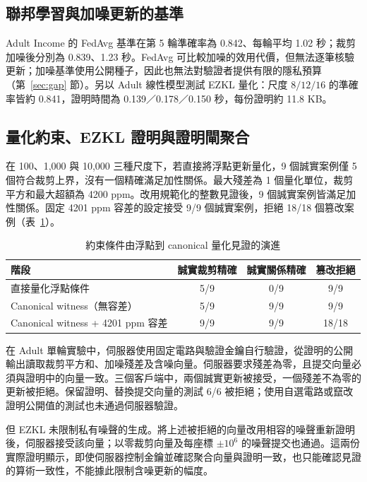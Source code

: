 \documentclass[12pt,a4paper]{article}
\begin{document}
\subsection{聯邦學習與加噪更新的基準}
\label{sec:res-baseline}
Adult Income 的 FedAvg 基準在第 5 輪準確率為 0.842、每輪平均 1.02 秒；裁剪加噪後分別為 0.839、1.23 秒。FedAvg 可比較加噪的效用代價，但無法逐筆核驗更新；加噪基準使用公開種子，因此也無法對驗證者提供有限的隱私預算（第~\ref{sec:gap} 節）。另以 Adult 線性模型測試 EZKL 量化：尺度 $8/12/16$ 的準確率皆約 0.841，證明時間為 0.139／0.178／0.150 秒，每份證明約 11.8 KB。

\subsection{量化約束、EZKL 證明與證明閘聚合}
\label{sec:res-constraint}
在 100、1,000 與 10,000 三種尺度下，若直接將浮點更新量化，9 個誠實案例僅 5 個符合裁剪上界，沒有一個精確滿足加性關係。最大殘差為 1 個量化單位，裁剪平方和最大超額為 4200 ppm。改用規範化的整數見證後，9 個誠實案例皆滿足加性關係。固定 4201 ppm 容差的設定接受 9/9 個誠實案例，拒絕 18/18 個篡改案例（表~\ref{tab:constraint}）。

\begin{table}[H]
\centering\small
\caption{約束條件由浮點到 canonical 量化見證的演進}
\label{tab:constraint}
\begin{tabular}{lccc}
\toprule
階段 & 誠實裁剪精確 & 誠實關係精確 & 篡改拒絕 \\
\midrule
直接量化浮點條件 & 5/9 & 0/9 & 9/9 \\
Canonical witness（無容差） & 5/9 & 9/9 & 9/9 \\
Canonical witness + 4201 ppm 容差 & 9/9 & 9/9 & 18/18 \\
\bottomrule
\end{tabular}
\end{table}

在 Adult 單輪實驗中，伺服器使用固定電路與驗證金鑰自行驗證，從證明的公開輸出讀取裁剪平方和、加噪殘差及含噪向量。伺服器要求殘差為零，且提交向量必須與證明中的向量一致。三個客戶端中，兩個誠實更新被接受，一個殘差不為零的更新被拒絕。保留證明、替換提交向量的測試 6/6 被拒絕；使用自選電路或竄改證明公開值的測試也未通過伺服器驗證。

但 EZKL 未限制私有噪聲的生成。將上述被拒絕的向量改用相容的噪聲重新證明後，伺服器接受該向量；以零裁剪向量及每座標 $\pm10^6$ 的噪聲提交也通過。這兩份實際證明顯示，即使伺服器控制金鑰並確認聚合向量與證明一致，也只能確認見證的算術一致性，不能據此限制含噪更新的幅度。
\end{document}
